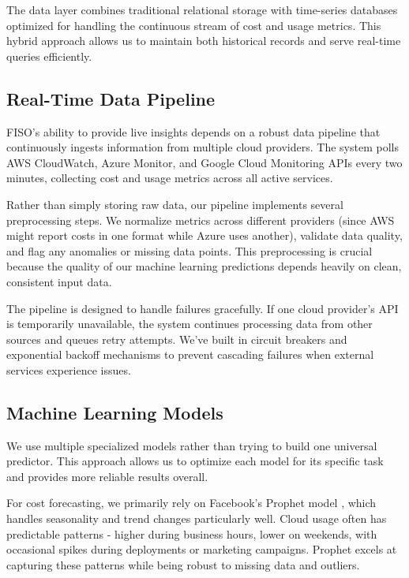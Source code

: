 \documentclass[conference]{IEEEtran}
\begin{document}
The data layer combines traditional relational storage with time-series databases optimized for handling the continuous stream of cost and usage metrics. This hybrid approach allows us to maintain both historical records and serve real-time queries efficiently.

\subsection{Real-Time Data Pipeline}

FISO's ability to provide live insights depends on a robust data pipeline that continuously ingests information from multiple cloud providers. The system polls AWS CloudWatch, Azure Monitor, and Google Cloud Monitoring APIs every two minutes, collecting cost and usage metrics across all active services.

Rather than simply storing raw data, our pipeline implements several preprocessing steps. We normalize metrics across different providers (since AWS might report costs in one format while Azure uses another), validate data quality, and flag any anomalies or missing data points. This preprocessing is crucial because the quality of our machine learning predictions depends heavily on clean, consistent input data.

The pipeline is designed to handle failures gracefully. If one cloud provider's API is temporarily unavailable, the system continues processing data from other sources and queues retry attempts. We've built in circuit breakers and exponential backoff mechanisms to prevent cascading failures when external services experience issues.

\subsection{Machine Learning Models}

We use multiple specialized models rather than trying to build one universal predictor. This approach allows us to optimize each model for its specific task and provides more reliable results overall.

For cost forecasting, we primarily rely on Facebook's Prophet model \cite{prophet}, which handles seasonality and trend changes particularly well. Cloud usage often has predictable patterns - higher during business hours, lower on weekends, with occasional spikes during deployments or marketing campaigns. Prophet excels at capturing these patterns while being robust to missing data and outliers.
\end{document}
